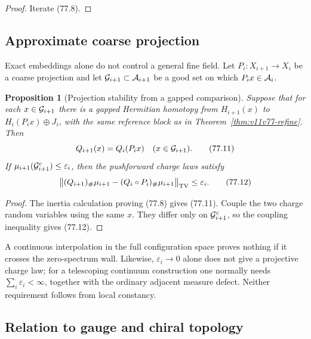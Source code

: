 \documentclass[11pt]{article}
\newtheorem{proposition}[theorem]{Proposition}
\begin{document}
\begin{proof}
Iterate (77.8).
\end{proof}

\subsection{Approximate coarse projection}

Exact embeddings alone do not control a general fine field.  Let
\(P_i:X_{i+1}\to X_i\) be a coarse projection and let
\({\cal G}_{i+1}\subset{\cal A}_{i+1}\) be a good set on which
\(P_ix\in{\cal A}_i\).

\begin{proposition}[Projection stability from a gapped comparison]
\label{prop:v11v77-project}
Suppose that for each \(x\in{\cal G}_{i+1}\) there is a gapped
Hermitian homotopy from \(H_{i+1}(x)\) to
\(H_i(P_ix)\oplus J_i\), with the same reference block as in
Theorem~\ref{thm:v11v77-refine}.  Then
\[
                             Q_{i+1}(x)=Q_i(P_ix)
                 \quad(x\in{\cal G}_{i+1}).                  \tag{77.11}
\]
If \(\mu_{i+1}({\cal G}_{i+1}^c)\le\varepsilon_i\), then the
pushforward charge laws satisfy
\[
 \big\|(Q_{i+1})_\#\mu_{i+1}
       -(Q_i\circ P_i)_\#\mu_{i+1}\big\|_{\rm TV}
 \le\varepsilon_i.                                           \tag{77.12}
\]
\end{proposition}

\begin{proof}
The inertia calculation proving (77.8) gives (77.11).
Couple the two charge random variables using the same \(x\).  They
differ only on \({\cal G}_{i+1}^c\), so the coupling inequality gives
(77.12).
\end{proof}

\begin{warning}
\label{warn:v11v77-admissibility}
A continuous interpolation in the full configuration space proves
nothing if it crosses the zero-spectrum wall.  Likewise,
\(\varepsilon_i\to0\) alone does not give a projective charge law;
for a telescoping continuum construction one normally needs
\(\sum_i\varepsilon_i<\infty\), together with the ordinary adjacent
measure defect.  Neither requirement follows from local constancy.
\end{warning}

\subsection{Relation to gauge and chiral topology}
\end{document}
